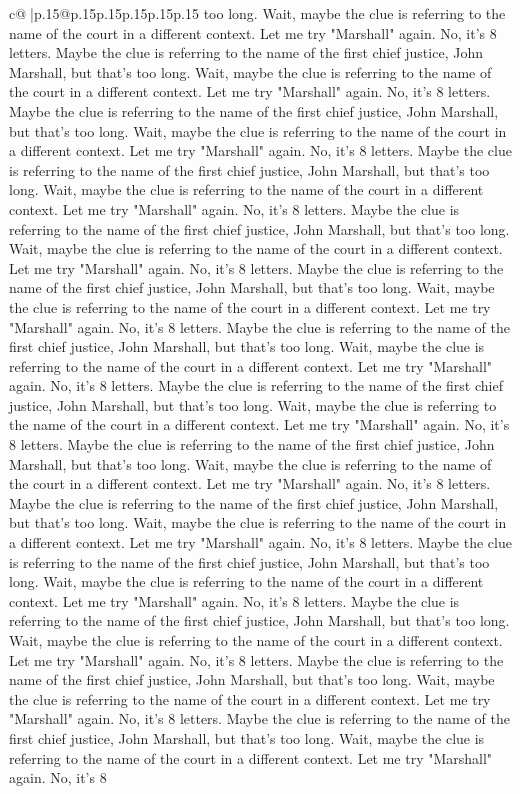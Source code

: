 \documentclass{article}
\begin{document}
{\begin{supertabular}{c@{$\;$}|p{.15\linewidth}@{}p{.15\linewidth}p{.15\linewidth}p{.15\linewidth}p{.15\linewidth}p{.15\linewidth}}
{{{too long. Wait, maybe the clue is referring to the name of the court in a different context. Let me try "Marshall" again. No, it's 8 letters. Maybe the clue is referring to the name of the first chief justice, John Marshall, but that's too long. Wait, maybe the clue is referring to the name of the court in a different context. Let me try "Marshall" again. No, it's 8 letters. Maybe the clue is referring to the name of the first chief justice, John Marshall, but that's too long. Wait, maybe the clue is referring to the name of the court in a different context. Let me try "Marshall" again. No, it's 8 letters. Maybe the clue is referring to the name of the first chief justice, John Marshall, but that's too long. Wait, maybe the clue is referring to the name of the court in a different context. Let me try "Marshall" again. No, it's 8 letters. Maybe the clue is referring to the name of the first chief justice, John Marshall, but that's too long. Wait, maybe the clue is referring to the name of the court in a different context. Let me try "Marshall" again. No, it's 8 letters. Maybe the clue is referring to the name of the first chief justice, John Marshall, but that's too long. Wait, maybe the clue is referring to the name of the court in a different context. Let me try "Marshall" again. No, it's 8 letters. Maybe the clue is referring to the name of the first chief justice, John Marshall, but that's too long. Wait, maybe the clue is referring to the name of the court in a different context. Let me try "Marshall" again. No, it's 8 letters. Maybe the clue is referring to the name of the first chief justice, John Marshall, but that's too long. Wait, maybe the clue is referring to the name of the court in a different context. Let me try "Marshall" again. No, it's 8 letters. Maybe the clue is referring to the name of the first chief justice, John Marshall, but that's too long. Wait, maybe the clue is referring to the name of the court in a different context. Let me try "Marshall" again. No, it's 8 letters. Maybe the clue is referring to the name of the first chief justice, John Marshall, but that's too long. Wait, maybe the clue is referring to the name of the court in a different context. Let me try "Marshall" again. No, it's 8 letters. Maybe the clue is referring to the name of the first chief justice, John Marshall, but that's too long. Wait, maybe the clue is referring to the name of the court in a different context. Let me try "Marshall" again. No, it's 8 letters. Maybe the clue is referring to the name of the first chief justice, John Marshall, but that's too long. Wait, maybe the clue is referring to the name of the court in a different context. Let me try "Marshall" again. No, it's 8 letters. Maybe the clue is referring to the name of the first chief justice, John Marshall, but that's too long. Wait, maybe the clue is referring to the name of the court in a different context. Let me try "Marshall" again. No, it's 8 letters. Maybe the clue is referring to the name of the first chief justice, John Marshall, but that's too long. Wait, maybe the clue is referring to the name of the court in a different context. Let me try "Marshall" again. No, it's 8 }}}
\end{supertabular}}
\end{document}
